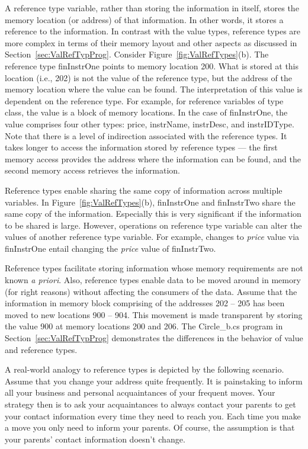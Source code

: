 A reference type variable, rather than storing the information in
itself, stores the memory location (or address) of that
information. In other words, it stores a reference to the
information. In contrast with the value types, reference types are
more complex in terms of their memory layout and other aspects as
discussed in Section~\ref{sec:ValRefTypProg}. Consider
Figure~\ref{fig:ValRefTypes}(b). The reference type finInstrOne
points to memory location 200. What is stored at this location
(i.e., 202) is not the value of the reference type, but the
address of the memory location where the value can be found. The
interpretation of this value is dependent on the reference type.
For example, for reference variables of type class, the value is a
block of memory locations. In the case of finInstrOne, the value
comprises four other types: price, instrName, instrDesc, and
instrIDType. Note that there is a level of indirection associated
with the reference types. It takes longer to access the
information stored by reference types --- the first memory access
provides the address where the information can be found, and the
second memory access retrieves the information.


Reference types enable sharing the same copy of information across
multiple variables. In Figure~\ref{fig:ValRefTypes}(b),
finInstrOne and finInstrTwo share the same copy of the
information. Especially this is very significant if the
information to be shared is large. However, operations on
reference type variable can alter the values of another reference
type variable. For example, changes to \emph{price} value via
finInstrOne entail changing the \emph{price} value of finInstrTwo.

Reference types facilitate storing information whose memory
requirements are not known \emph{a priori}. Also, reference types
enable data to be moved around in memory (for right reasons)
without affecting the consumers of the data. Assume that the
information in memory block comprising of the addresses 202 -- 205
has been moved to new locations 900 -- 904. This movement is made
transparent by storing the value 900 at memory locations 200 and
206. The Circle\_b.cs program in Section~\ref{sec:ValRefTypProg}
demonstrates the differences in the behavior of value and
reference types.


A real-world analogy to reference types is depicted by the
following scenario. Assume that you change your address quite
frequently. It is painstaking to inform all your business and
personal acquaintances of your frequent moves. Your strategy then
is to ask your acquaintances to always contact your parents to get
your contact information every time they need to reach you. Each
time you make a move you only need to inform your parents. Of
course, the assumption is that your parents' contact information
doesn't change.

